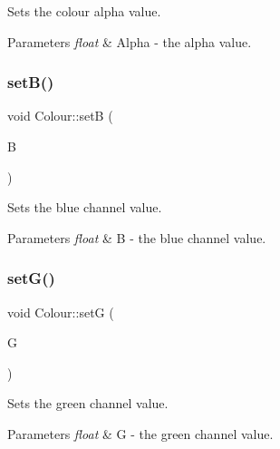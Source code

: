 Sets the colour alpha value. 


\begin{DoxyParams}{Parameters}
{\em float} & Alpha -\/ the alpha value. \\
\hline
\end{DoxyParams}
\mbox{\label{classColour_ab29d4612841a580f2b668f1f2710b978}} 
\subsubsection{\texorpdfstring{set\+B()}{setB()}}
{\footnotesize\ttfamily void Colour\+::setB (\begin{DoxyParamCaption}\item[{float}]{B }\end{DoxyParamCaption})\hspace{0.3cm}{\ttfamily [inline]}}



Sets the blue channel value. 


\begin{DoxyParams}{Parameters}
{\em float} & B -\/ the blue channel value. \\
\hline
\end{DoxyParams}
\mbox{\label{classColour_a7486867cf650aa822660cf40c394e06c}} 
\subsubsection{\texorpdfstring{set\+G()}{setG()}}
{\footnotesize\ttfamily void Colour\+::setG (\begin{DoxyParamCaption}\item[{float}]{G }\end{DoxyParamCaption})\hspace{0.3cm}{\ttfamily [inline]}}



Sets the green channel value. 


\begin{DoxyParams}{Parameters}
{\em float} & G -\/ the green channel value. \\
\hline
\end{DoxyParams}
\mbox{\label{classColour_aeff40cb4f5ed87207c0efb2de32c01ad}} 

